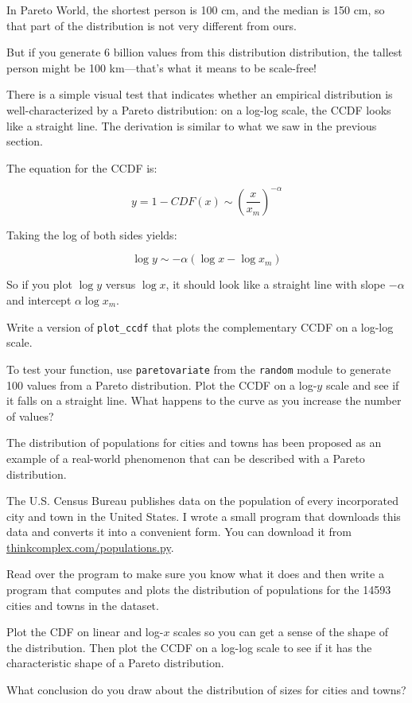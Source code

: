 \documentclass[10pt]{book}
\begin{document}
In Pareto World, the shortest person is 100 cm,
and the median is 150 cm, so that part of the distribution is not
very different from ours.

But if you generate 6 billion values from this distribution
distribution, the tallest person might
be 100 km---that's what it means to
be scale-free!

There is a simple visual test that indicates whether an empirical
distribution is well-characterized by a Pareto distribution: on a
log-log scale, the CCDF looks like a straight line.  The derivation is
similar to what we saw in the previous section.

The equation for the CCDF is:

\[ y = 1 - CDF(x) \sim \left( \frac{x}{x_m} \right) ^{-\alpha} \]

Taking the log of both sides yields:

\[ \log y \sim -\alpha (\log x - \log x_m ) \]

So if you plot $\log y$ versus $\log x$, it should look like a
straight line with slope $-\alpha$ and intercept $\alpha \log x_m$.

\begin{exercise}

Write a version of \verb"plot_ccdf" that plots the complementary
CCDF on a log-log scale.

To test your function, use {\tt paretovariate} from the {\tt random}
module to generate 100 values from a Pareto distribution.  Plot
the CCDF on a log-$y$ scale and see if it falls on a straight line.
What happens to the curve as you increase the number of values?

\end{exercise}


\begin{exercise}

The distribution of populations for cities and towns has been proposed
as an example of a real-world phenomenon that can be described
with a Pareto distribution.

The U.S. Census Bureau publishes data on the population of every
incorporated city and town in the United States.  I wrote a
small program that downloads this data and converts it into a
convenient form.  You can download it from
\url{thinkcomplex.com/populations.py}.

Read over the program to make sure you know what it does and then
write a program that computes and plots the distribution of
populations for the 14593 cities and towns in the dataset.

Plot the CDF on linear and log-$x$ scales so you can get a sense of
the shape of the distribution.  Then plot the CCDF on a log-log scale
to see if it has the characteristic shape of a Pareto distribution.

What conclusion do you draw about the distribution of sizes
for cities and towns?

\end{exercise}
\end{document}
